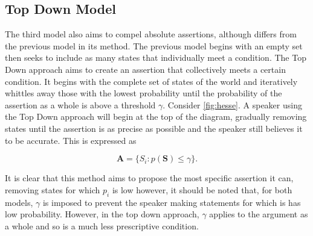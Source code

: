 \subsection{Top Down Model}


The third model also aims to compel absolute assertions, although differs from the previous model in its method. The previous model begins with an empty set then seeks to include as many states that individually meet a condition. The Top Down approach aims to create an assertion that collectively meets a certain condition. It begins with the complete set of states of the world and iteratively whittles away those with the lowest probability until the probability of the assertion as a whole is above a threshold $\gamma$. Consider \cref{fig:hesse}. A speaker using the Top Down approach will begin at the top of the diagram, gradually removing states until the assertion is as precise as possible and the speaker still believes it to be accurate. This is expressed as

\begin{equation} \label{eq:TD_approach}
    \mathbf{A} = \{ S_i: p(\mathbf{S}) \leq \gamma  \}. 
\end{equation}


It is clear that this method aims to propose the most specific assertion it can, removing states for which $p_i$ is low however, it should be noted that, for both models, $\gamma$ is imposed to prevent the speaker making statements for which is has low probability. However, in the top down approach, $\gamma$ applies to the argument as a whole and so is a much less prescriptive condition. 


